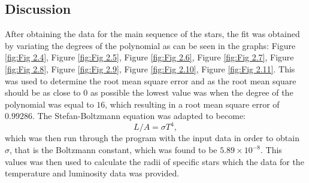 \documentclass[12pt, a4paper]{article}
\begin{document}
\subsection{Discussion}
After obtaining the data for the main sequence of the stars, the fit was obtained by variating the degrees of the polynomial as can be seen in the graphs: Figure \ref{fig:Fig 2.4}, Figure \ref{fig:Fig 2.5}, Figure \ref{fig:Fig 2.6}, Figure \ref{fig:Fig 2.7}, Figure \ref{fig:Fig 2.8}, Figure \ref{fig:Fig 2.9}, Figure \ref{fig:Fig 2.10}, Figure \ref{fig:Fig 2.11}. This was used to determine the root mean square error and as the root mean square should be as close to 0 as possible the lowest value was when the degree of the polynomial was equal to \(16\), which resulting in a root mean square error of \(0.99286\). The Stefan-Boltzmann equation was adapted to become:
\begin{equation}
    L/A = \sigma T^4 ,
\end{equation}
which was then run through the program with the input data in order to obtain \(\sigma\), that is the Boltzmann constant, which was found to be \(5.89 \times 10^{-8}\). This values was then used to calculate the radii of specific stars which the data for the temperature and luminosity data was provided. 
\end{document}
